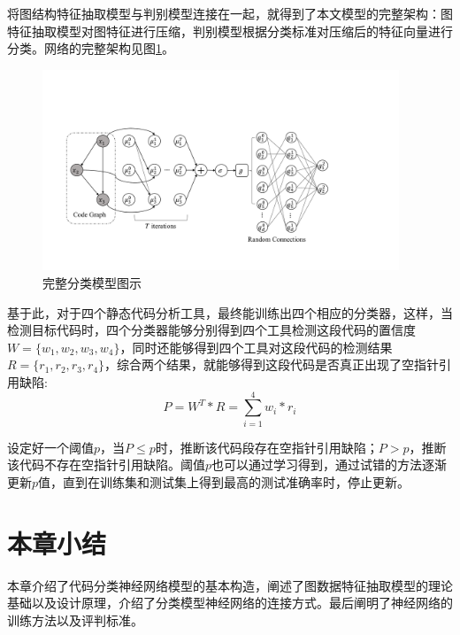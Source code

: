 将图结构特征抽取模型与判别模型连接在一起，就得到了本文模型的完整架构：图特征抽取模型对图特征进行压缩，判别模型根据分类标准对压缩后的特征向量进行分类。网络的完整架构见图\ref{fig:c_mod}。
\begin{figure}[htbp]
	\begin{center}
		\includegraphics[width=0.95\textwidth]{figures//6.pdf}
		\caption{完整分类模型图示}
		\label{fig:c_mod}
	\end{center}
\end{figure}
\par 基于此，对于四个静态代码分析工具，最终能训练出四个相应的分类器，这样，当检测目标代码时，四个分类器能够分别得到四个工具检测这段代码的置信度$W = \{w_1, w_2, w_3, w_4\}$，同时还能够得到四个工具对这段代码的检测结果$R = \{r_1, r_2, r_3, r_4\}$，综合两个结果，就能够得到这段代码是否真正出现了空指针引用缺陷:
$$P = W^T*R = \sum_{i=1}^4 w_i*r_i$$
\par 设定好一个阈值$p$，当$P\le p$时，推断该代码段存在空指针引用缺陷；$P>p$，推断该代码不存在空指针引用缺陷。阈值$p$也可以通过学习得到，通过试错的方法逐渐更新$p$值，直到在训练集和测试集上得到最高的测试准确率时，停止更新。
\section{本章小结}
本章介绍了代码分类神经网络模型的基本构造，阐述了图数据特征抽取模型的理论基础以及设计原理，介绍了分类模型神经网络的连接方式。最后阐明了神经网络的训练方法以及评判标准。